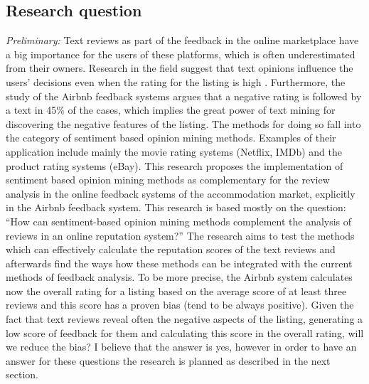 \documentclass[a4paper, 11pt]{article}
\begin{document}
\subsection{Research question}
\textit{Preliminary:} Text reviews as part of the feedback in the online marketplace have a big importance for the users of
these platforms, which is often underestimated from their owners. Research in the field suggest that text
opinions influence the users’ decisions even when the rating for the listing is high \cite{fradkin2016bias}. Furthermore, the
study of the Airbnb feedback systems argues that a negative rating is followed by a text in 45\% of the cases,
which implies the great power of text mining for discovering the negative features of the listing. The methods for doing so fall into the category of sentiment based opinion mining methods. Examples of their application include mainly the movie rating systems (Netflix, IMDb) and the product rating systems (eBay).
This research proposes the implementation of sentiment based opinion mining methods as complementary for the review analysis in the online feedback systems of the accommodation market, explicitly in the Airbnb feedback system.
This research is based mostly on the question: “How can sentiment-based opinion mining methods complement the analysis of reviews in an online reputation system?” The research aims to test the methods which can effectively calculate the reputation scores of the text reviews and afterwards find the ways how these methods can be integrated with the current methods of feedback analysis. To be more precise, the Airbnb system calculates now the overall rating for a listing based on the average score of at least three reviews and this score has a proven bias (tend to be always positive). Given the fact that text reviews reveal often the negative aspects of the listing, generating a low score of feedback for them and calculating this score in the overall rating, will we reduce the bias? I believe that the answer is yes, however in order to have an answer for these questions the research is planned as described in the next section.
\end{document}
